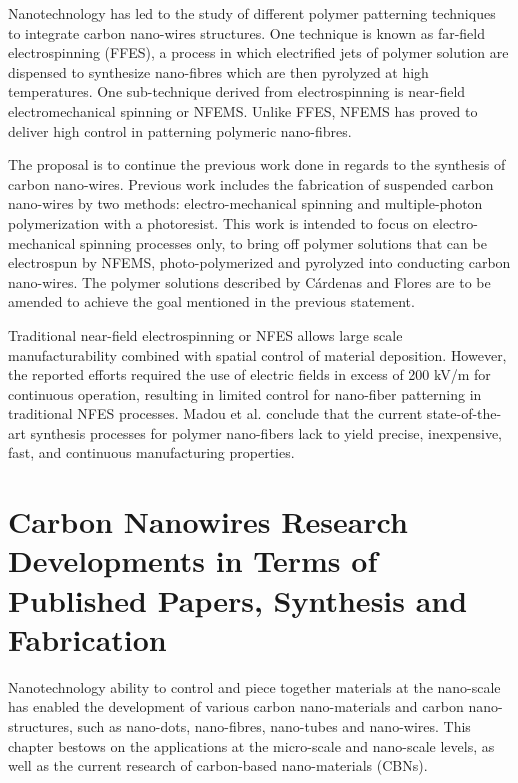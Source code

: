 Nanotechnology has led to the study of different polymer patterning techniques to integrate carbon nano-wires structures. One technique is known as far-field electrospinning (FFES), a process in which electrified jets of polymer solution are dispensed to synthesize nano-fibres which are then pyrolyzed at high temperatures. One sub-technique derived from electrospinning is near-field electromechanical spinning or NFEMS. Unlike FFES, NFEMS has proved to deliver high control in patterning polymeric nano-fibres. \cite{Cardenas2017}

The proposal is to continue the previous work done in regards to the synthesis of carbon nano-wires. Previous work includes the fabrication of suspended carbon nano-wires by two methods: electro-mechanical spinning and multiple-photon polymerization with a photoresist. \cite{Cardenas2017, Flores2017} This work is intended to focus on electro-mechanical spinning processes only, to bring off polymer solutions that can be electrospun by NFEMS, photo-polymerized and pyrolyzed into conducting carbon nano-wires. The polymer solutions described by Cárdenas and Flores \cite{Flores2017, Cardenas2017} are to be amended to achieve the goal mentioned in the previous statement.

Traditional near-field electrospinning or NFES allows large scale manufacturability combined with spatial control of material deposition. \cite{Madou2011} However, the reported efforts required the use of electric fields in excess of 200 kV/m for continuous operation, resulting in limited control for nano-fiber patterning in traditional NFES processes. Madou et al. \cite{Madou2011} conclude that the current state-of-the-art synthesis processes for polymer nano-fibers lack to yield precise, inexpensive, fast, and continuous manufacturing properties.

\section{Carbon Nanowires Research Developments in Terms of Published Papers, Synthesis and Fabrication}


Nanotechnology ability to control and piece together materials at the nano-scale has enabled the development of various carbon nano-materials and carbon nano-structures, such as nano-dots, nano-fibres, nano-tubes and nano-wires. \cite{Posthuma-Trumpie2012, Zhang2009, DeVolder2011, Cao2011} This chapter bestows on the applications at the micro-scale and nano-scale levels, as well as the current research of carbon-based nano-materials (CBNs).

